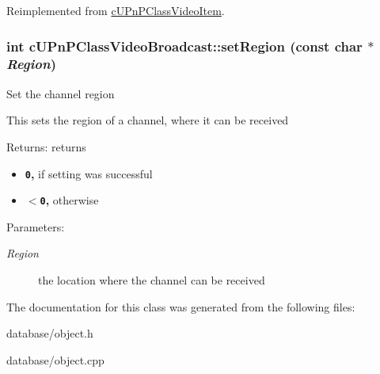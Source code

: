 Reimplemented from \hyperlink{classcUPnPClassVideoItem_3cbda6d87f5a9ff0475a75e76ba19924}{cUPnPClassVideoItem}.\hypertarget{classcUPnPClassVideoBroadcast_228fcc06291dc3989917bbfa5ce3153f}{
\subsubsection[{setRegion}]{\setlength{\rightskip}{0pt plus 5cm}int cUPnPClassVideoBroadcast::setRegion (const char $\ast$ {\em Region})}}
\label{classcUPnPClassVideoBroadcast_228fcc06291dc3989917bbfa5ce3153f}


Set the channel region

This sets the region of a channel, where it can be received

\begin{Desc}
\item[Returns:]returns\begin{itemize}
\item {\bf {\tt 0},} if setting was successful\item {\bf {\tt $<$0},} otherwise \end{itemize}
\end{Desc}
\begin{Desc}
\item[Parameters:]
\begin{description}
\item[{\em Region}]the location where the channel can be received \end{description}
\end{Desc}


The documentation for this class was generated from the following files:\begin{CompactItemize}
\item 
database/object.h\item 
database/object.cpp\end{CompactItemize}
